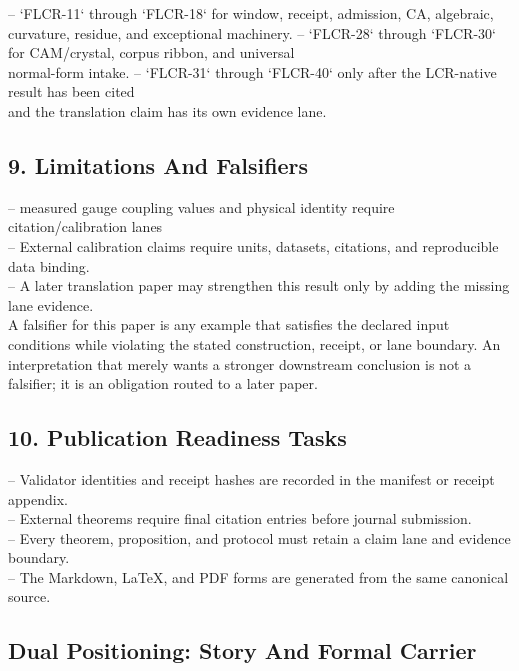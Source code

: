 \documentclass[11pt]{article}
\begin{document}
\noindent{}-- `FLCR-11` through `FLCR-18` for window, receipt, admission, CA, algebraic,\\
  curvature, residue, and exceptional machinery.
\noindent{}-- `FLCR-28` through `FLCR-30` for CAM/crystal, corpus ribbon, and universal\\
  normal-form intake.
\noindent{}-- `FLCR-31` through `FLCR-40` only after the LCR-native result has been cited\\
  and the translation claim has its own evidence lane.

\subsection*{9. Limitations And Falsifiers}

\noindent{}-- measured gauge coupling values and physical identity require citation/calibration lanes\\
\noindent{}-- External calibration claims require units, datasets, citations, and reproducible data binding.\\
\noindent{}-- A later translation paper may strengthen this result only by adding the missing lane evidence.\\

A falsifier for this paper is any example that satisfies the declared input
conditions while violating the stated construction, receipt, or lane boundary.
An interpretation that merely wants a stronger downstream conclusion is not a
falsifier; it is an obligation routed to a later paper.

\subsection*{10. Publication Readiness Tasks}

\noindent{}-- Validator identities and receipt hashes are recorded in the manifest or receipt appendix.\\
\noindent{}-- External theorems require final citation entries before journal submission.\\
\noindent{}-- Every theorem, proposition, and protocol must retain a claim lane and evidence boundary.\\
\noindent{}-- The Markdown, LaTeX, and PDF forms are generated from the same canonical source.\\

\subsection*{Dual Positioning: Story And Formal Carrier}
\end{document}
